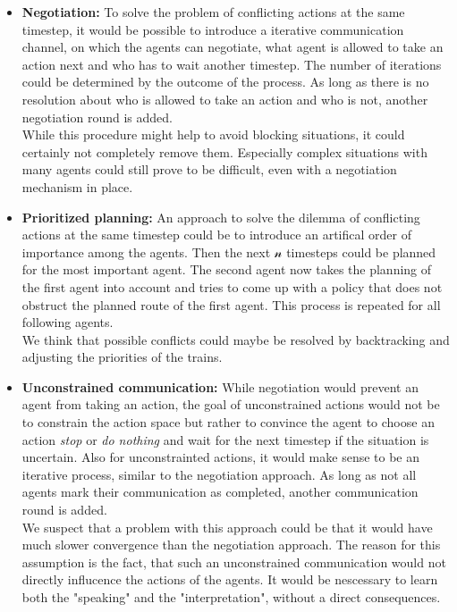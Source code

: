 \begin{itemize}
	\item \textbf{Negotiation:} To solve the problem of conflicting actions at the same timestep, it would be possible to introduce a iterative communication channel, on which the agents can negotiate, what agent is allowed to take an action next and who has to wait another timestep. The number of iterations could be determined by the outcome of the process. As long as there is no resolution about who is allowed to take an action and who is not, another negotiation round is added.\\
	While this procedure might help to avoid blocking situations, it could certainly not completely remove them. Especially complex situations with many agents could still prove to be difficult, even with a negotiation mechanism in place.

	\item \textbf{Prioritized planning:} An approach to solve the dilemma of conflicting actions at the same timestep could be to introduce an artifical order of importance among the agents. Then the next $\mathcal{n}$ timesteps could be planned for the most important agent. The second agent now takes the planning of the first agent into account and tries to come up with a policy that does not obstruct the planned route of the first agent. This process is repeated for all following agents.\\
	We think that possible conflicts could maybe be resolved by backtracking and adjusting the priorities of the trains.	
	
	\item \textbf{Unconstrained communication:} While negotiation would prevent an agent from taking an action, the goal of unconstrained actions would not be to constrain the action space but rather to convince the agent to choose an action \textit{stop} or \textit{do nothing} and wait for the next timestep if the situation is uncertain. Also for unconstrainted actions, it would make sense to be an iterative process, similar to the negotiation approach. As long as not all agents mark their communication as completed, another communication round is added.\\
	We suspect that a problem with this approach could be that it would have much slower convergence than the negotiation approach. The reason for this assumption is the fact, that such an unconstrained communication would not directly influcence the actions of the agents. It would be nescessary to learn both the "speaking" and the "interpretation", without a direct consequences.
\end{itemize}

